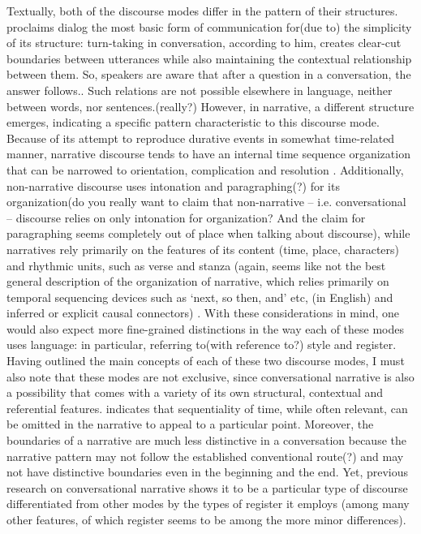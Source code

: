 \documentclass[12pt]{turabian-researchpaper}
\begin{document}
Textually, both of the discourse modes differ in the pattern of their structures. \textcite{bakhtin1986} proclaims dialog the most basic form of communication for(due to) the simplicity of its structure: turn-taking in conversation, according to him, creates clear-cut boundaries between utterances while also maintaining the contextual relationship between them. So, speakers are aware that after a question in a conversation, the answer follows.. Such relations are not possible elsewhere in  language, neither between words, nor sentences.(really?) However, in  narrative, a different structure emerges, indicating a specific pattern characteristic to this discourse mode. Because of its attempt to reproduce durative events in somewhat time-related manner, narrative discourse tends to have an internal time sequence organization that can be narrowed to orientation, complication and resolution \parencite{labov1967}. Additionally, non-narrative discourse uses intonation and paragraphing(?) for its organization(do you really want to claim that non-narrative – i.e. conversational – discourse relies on only intonation for organization? And the claim for paragraphing seems completely out of place when talking about discourse), while narratives rely primarily on the features of its content (time, place, characters) and rhythmic units, such as verse and stanza (again, seems like not the best general description of the organization of narrative, which relies primarily on temporal sequencing devices such as ‘next, so then, and’ etc, (in English) and inferred or explicit causal connectors) \parencite{georgakopoulou2000}. With these considerations in mind, one would also expect more fine-grained distinctions in the way each of these modes uses language: in particular, referring to(with reference to?) style and register. 
Having outlined the main concepts of each of these two discourse modes, I must also note that these modes are not exclusive, since conversational narrative is also a possibility that comes with a variety of its own structural, contextual and referential features. \textcite{norrick2000} indicates that sequentiality of time, while often relevant, can be omitted in the narrative to appeal to a particular point. Moreover, the boundaries of a narrative are much less distinctive in a conversation because the narrative pattern may not follow the established conventional route(?) and may not have distinctive boundaries even in the beginning and the end. Yet, previous research on conversational narrative shows it to be a particular type of discourse differentiated from other modes by the types of register it employs (among many other features, of which register seems to be among the more minor differences).
\end{document}
